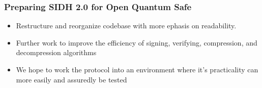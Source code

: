 \documentclass{beamer}
\begin{document}
\begin{frame}
\frametitle{Preparing SIDH 2.0 for Open Quantum Safe}
\begin{itemize}
\item Restructure and reorganize codebase with more ephasis on readability.
\item Further work to improve the efficiency of signing, verifying, compression, and decompression algorithms
\item We hope to work the protocol into an environment where it's practicality can more easily and assuredly be tested
\end{itemize}
\end{frame}

\end{document}
